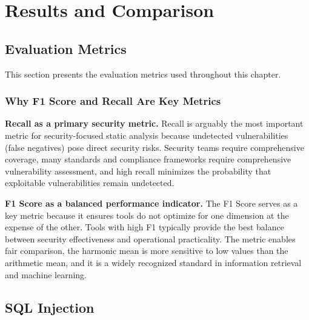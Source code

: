 \chapter{Results and Comparison}
\label{ch:results}

\section{Evaluation Metrics}
\label{sec:evaluation_metrics}

This section presents the evaluation metrics used throughout this chapter.

\subsection*{Why F1 Score and Recall Are Key Metrics}

\textbf{Recall as a primary security metric.}
Recall is arguably the most important metric for security-focused static analysis because
undetected vulnerabilities (false negatives) pose direct security risks. Security teams
require comprehensive coverage, many standards and compliance frameworks require
comprehensive vulnerability assessment, and high recall minimizes the probability that
exploitable vulnerabilities remain undetected.

\textbf{F1 Score as a balanced performance indicator.}
The F1 Score serves as a key metric because it ensures tools do not optimize for one
dimension at the expense of the other. Tools with high F1 typically provide the best
balance between security effectiveness and operational practicality. The metric enables
fair comparison, the harmonic mean is more sensitive to low values than the arithmetic
mean, and it is a widely recognized standard in information retrieval and machine
learning.

\section{SQL Injection}
\label{sec:results_sql}

